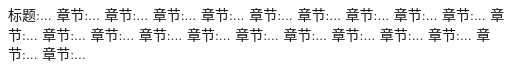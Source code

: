 标题:...
章节:...
章节:...
章节:...
章节:...
章节:...
章节:...
章节:...
章节:...
章节:...
章节:...
章节:...
章节:...
章节:...
章节:...
章节:...
章节:...
章节:...
章节:...
章节:...
章节:...
章节:...
